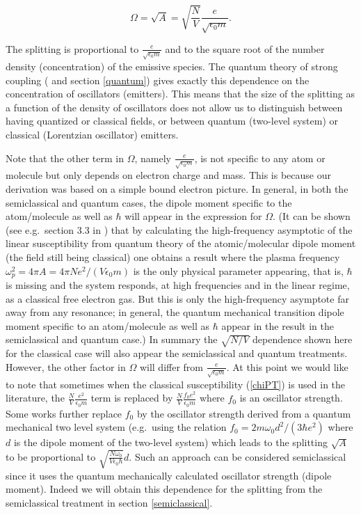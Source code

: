 \documentclass[12pt]{iopart}
\begin{document}
\begin{equation}
\Omega = \sqrt{A} = \sqrt{\frac{N}{V}} \frac{e}{\sqrt{\epsilon_0 m}}.  \label{OmegaClassicalPT2}
\end{equation}

The splitting is proportional to $\frac{e}{\sqrt{\epsilon_0 m}}$ and to the square root of the number density (concentration) of the emissive species. The quantum theory of strong coupling (\cite{Agarwal1984} and section \ref{quantum}) gives exactly this dependence on the concentration of oscillators (emitters). This means that the size of the splitting as a function of the density of oscillators does not allow us to distinguish between having quantized or classical fields, or between quantum (two-level system) or classical (Lorentzian oscillator) emitters.

Note that the other term in $\Omega$, namely $\frac{e}{\sqrt{\epsilon_0 m}}$, is not specific to any atom or molecule but only depends on electron charge and mass. This is because our derivation was based on a simple bound electron picture. In general, in both the semiclassical and quantum cases, the dipole moment specific to the atom/molecule as well as $\hbar$ will appear in the expression for $\Omega$. (It can be shown (see e.g.\ section 3.3 in \cite{Lucarini2005}) that by calculating the high-frequency asymptotic of the linear susceptibility from quantum theory of the atomic/molecular dipole moment (the field still being classical) one obtains a result where the plasma frequency $\omega_p^2 = 4 \pi A = 4 \pi Ne^2/(V \epsilon_0 m)$ is the only physical parameter appearing, that is, $\hbar$ is missing and the system responds, at high frequencies and in the linear regime, as a classical free electron gas. But this is only the high-frequency asymptote far away from any resonance; in general, the quantum mechanical transition dipole moment specific to an atom/molecule as well as $\hbar$ appear in the result in the semiclassical and quantum case.) In summary the $\sqrt{N/V}$ dependence shown here for the classical case will also appear the semiclassical and quantum treatments. However, the other factor in $\Omega$ will differ from $\frac{e}{\sqrt{\epsilon_0 m}}$. At this point we would like to note that sometimes when the classical susceptibility (\ref{chiPT}) is used in the literature, the $\frac{N}{V}\frac{e^2}{\epsilon_0 m}$ term is replaced by $\frac{N}{V}\frac{f_0 e^2}{\epsilon_0 m}$ where $f_0$ is an oscillator strength. Some works further replace $f_0$ by the oscillator strength derived from a quantum mechanical two level system (e.g.\ using the relation $f_0 = 2m\omega_0 d^2/(3\hbar e^2)$ 
\cite{Liboff2003} where $d$ is the dipole moment of the two-level system) which leads to the splitting $\sqrt{A}$ to be proportional to $\sqrt{\frac{N\omega_0}{V\epsilon_0 \hbar}}d$. Such an approach can be considered semiclassical since it uses the quantum mechanically calculated oscillator strength (dipole moment). Indeed we will obtain this dependence for the splitting from the semiclassical treatment in section \ref{semiclassical}.    
\end{document}
